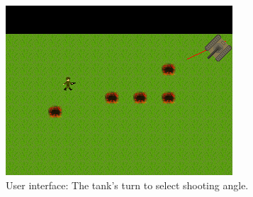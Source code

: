 \begin{figure}[ht]
\centering
\includegraphics[scale=0.6]{screenshots/16747.png}
\caption{User interface: The tank's turn to select shooting angle.}
\label{fig:gamescr2}
\end{figure}
